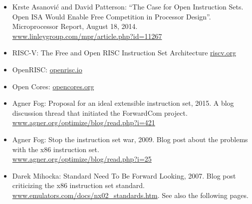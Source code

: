 \documentclass[forwardcom.tex]{subfiles}
\begin{document}
\begin{itemize}
\item
Krste Asanovi\'{c} and David Patterson: ``The Case for Open Instruction Sets. Open ISA Would Enable Free 
Competition in Processor Design''. Microprocessor Report, August 18, 2014. \\
\href{http://www.linleygroup.com/mpr/article.php?id=11267}{www.linleygroup.com/mpr/article.php?id=11267}

\item
RISC-V: The Free and Open RISC Instruction Set Architecture
\href{http://riscv.org}{riscv.org}

\item
OpenRISC: 
\href{http://openrisc.io}{openrisc.io}

\item
Open Cores: 
\href{http://opencores.org}{opencores.org}

\item
Agner Fog: Proposal for an ideal extensible instruction set, 2015. A blog discussion thread that initiated the ForwardCom project. \\
\href{http://www.agner.org/optimize/blog/read.php?i=421}{www.agner.org/optimize/blog/read.php?i=421}

\item
Agner Fog: Stop the instruction set war, 2009. Blog post about the problems with the x86 instruction set. \\
\href{http://www.agner.org/optimize/blog/read.php?i=25}{www.agner.org/optimize/blog/read.php?i=25}

\item
Darek Mihocka: Standard Need To Be Forward Looking, 2007. Blog post criticizing the x86 instruction set standard. \\
\href{http://www.emulators.com/docs/nx02_standards.htm}{www.emulators.com/docs/nx02\_standards.htm}.
See also the following pages.
\end{itemize}
\end{document}

